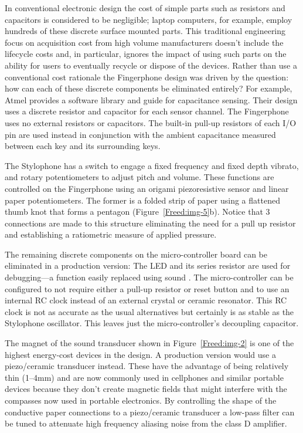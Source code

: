 In conventional electronic design the cost of simple parts such as
resistors and capacitors is considered to be negligible; laptop computers, for
example, employ hundreds of these discrete surface mounted parts. This
traditional engineering focus on acquisition cost from high volume manufacturers
doesn't include the lifecycle costs and, in particular, ignores the impact of
using such parts on the ability for users to eventually recycle or dispose of the
devices. Rather than use a conventional cost rationale the Fingerphone design was
driven by the question: how can each of these discrete components be eliminated
entirely? For example, Atmel provides a software library and guide for
capacitance sensing. Their design uses a discrete resistor and capacitor for each
sensor channel. The Fingerphone uses no external resistors or capacitors. The
built-in pull-up resistors of each I/O pin are used instead in conjunction with
the ambient capacitance measured between each key and its surrounding keys.

The Stylophone has a switch to engage a fixed frequency and fixed
depth vibrato, and rotary potentiometers to adjust pitch and volume. These
functions are controlled on the Fingerphone using an origami piezoresistive
sensor and linear paper potentiometers. The former is a folded strip of paper
using a flattened thumb knot that forms a pentagon (Figure~\ref{Freed:img-5}b). Notice that 3
connections are made to this structure eliminating the need for a pull up
resistor and establishing a ratiometric measure of applied pressure.




The remaining discrete components on the micro-controller board can be
eliminated in a production version: The LED and its series resistor are used for
debugging---a function easily replaced using sound \cite{Turing:1951}. The micro-controller can
be configured to not require either a pull-up resistor or reset button and to use
an internal RC clock instead of an external crystal or ceramic resonator. This RC
clock is not as accurate as the usual alternatives but certainly is as stable as
the Stylophone oscillator. This leaves just the micro-controller's decoupling
capacitor.

The magnet of the sound transducer shown in Figure~\ref{Freed:img-2} is one of the
highest energy-cost devices in the design. A production version would use a
piezo/ceramic transducer instead. These have the advantage of being relatively
thin (1--4mm) and are now commonly used in cellphones and similar portable devices
because they don't create magnetic fields that might interfere with the compasses
now used in portable electronics. By controlling the shape of the conductive
paper connections to a piezo/ceramic transducer a low-pass filter can be tuned to
attenuate high frequency aliasing noise from the class D amplifier.

